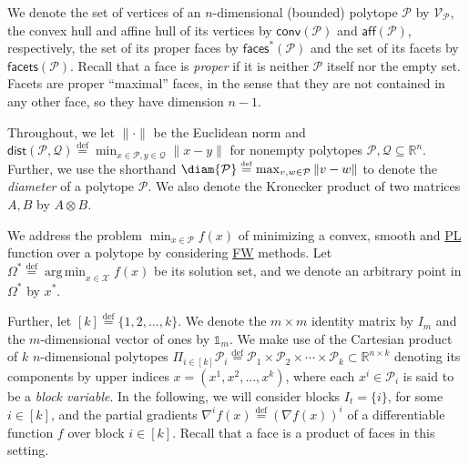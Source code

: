 \documentclass{article}
\newcommand{\R}{\mathbb{R}}
\newcommand{\ones}{\mathbb{1}}
\newcommand{\mP}{\mathcal{P}}
\newcommand{\mQ}{\mathcal{Q}}
\newcommand{\mX}{\mathcal{X}}
\newcommand{\verts}[1]{\mathcal{V}_{#1}}
\newcommand{\conv}[1]{\mathsf{conv}\left(#1\right)}
\newcommand{\aff}[1]{\mathsf{aff}\left(#1\right)}
\newcommand{\faces}[1]{{\mathsf{faces}^\ast}\left(#1\right)}
\newcommand{\facets}[1]{\mathsf{facets}\left(#1\right)}
\newcommand{\dist}[1]{\mathsf{dist}\left(#1\right)}
\newcommand{\proj}{\mathsf{Proj}}
\DeclareMathOperator*{\argmin}{\mathrm{arg\,min}}
\newcommand{\defi}{\stackrel{\mathrm{\scriptscriptstyle def}}{=}}
\newif\ifTODO
\newcommand{\dav}[1]{\ifTODO \todo[size=\scriptsize, color=yellow]{DM: #1}{} \fi}
\newcommand\newlink[2]{\hyperlink{#1}{\normalcolor #2}}
\newcommand{\PL}{\newlink{def:acronym_polyak_lojasiewicz}{PL}}
\newcommand{\FW}{\newlink{def:acronym_frank_wolfe}{FW}}
\begin{document}
We denote the set of vertices of an $n$-dimensional (bounded) polytope $\mP$ by $\verts{\mP}$, the convex hull and affine hull of its vertices by $\conv{\mP}$ and $\aff{\mP}$, respectively, the set of its proper faces by $\faces{\mP}$ and the set of its facets by $\facets{\mP}$.
Recall that a face
is \emph{proper} if it is neither $\mP$ itself nor the empty set.
Facets are proper ``maximal'' faces, in the sense that they are not contained in any other face, so they have dimension $n-1$.

Throughout, we let $\|\cdot\|$ be the Euclidean norm and
$\dist{\mP, \mQ} \defi \min_{x \in \mP, y \in \mQ} \|x - y\|$ for nonempty polytopes $\mP, \mQ \subseteq \R^n$.
Further, we use the shorthand $\diam{\mP} \defi \max_{v, w \in \mathcal{P}} \|v - w\|$ to denote the \emph{diameter} of a polytope $\mathcal{P}$.
We also denote the Kronecker product of two matrices $A, B$ by $A \otimes B$.

We address the problem $\min_{x \in \mP} f(x)$ of minimizing a convex, smooth and \PL{} function over a polytope by considering \FW{} methods. Let $\Omega^\ast \defi \argmin_{x \in \mX} f(x)$ be its solution set, and we denote an arbitrary point in $\Omega^\ast$ by $x^\ast$.

Further, let $[k] \defi \{1, 2, \dots, k\}$. We denote the %
$m \times m$ identity matrix by $I_m$ and the $m$-dimensional vector of ones by $\ones_m$.
We make use of the Cartesian product of $k$ $n$-dimensional polytopes $\Pi_{i \in [k]} \mP_i \defi \mP_1 \times \mP_2 \times \cdots \times \mP_k \subset \R^{n \times k}$ denoting its components by upper indices $x = (x^1, x^2, \dots, x^k)$, where each $x^i \in \mP_i$ is said to be a \emph{block variable}.
In the following, we will consider blocks $I_t = \{i\}$, for some $i \in [k]$, and the partial gradients $\nabla^i f(x) \defi (\nabla f(x))^i$ of a differentiable function $f$ over block $i \in [k]$.
Recall that a face is a product of faces in this setting.
\end{document}
